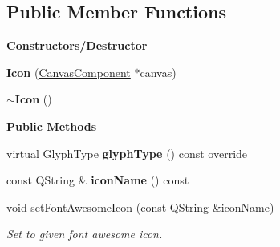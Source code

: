 \subsection*{Public Member Functions}
\begin{Indent}\textbf{ Constructors/\+Destructor}\par
\begin{DoxyCompactItemize}
\item 
\mbox{\label{classrev_1_1_icon_ad594b804eccb8eaa82b387af7d73b028}} 
{\bfseries Icon} (\mbox{\hyperlink{classrev_1_1_canvas_component}{Canvas\+Component}} $\ast$canvas)
\item 
\mbox{\label{classrev_1_1_icon_aa063a3fd745c54e780594195b546a21f}} 
{\bfseries $\sim$\+Icon} ()
\end{DoxyCompactItemize}
\end{Indent}
\begin{Indent}\textbf{ Public Methods}\par
\begin{DoxyCompactItemize}
\item 
\mbox{\label{classrev_1_1_icon_a6ffe16ff8c880b23695383a242117630}} 
virtual Glyph\+Type {\bfseries glyph\+Type} () const override
\item 
\mbox{\label{classrev_1_1_icon_af05cb7f6f6f53daaab546b4b8eb622e9}} 
const Q\+String \& {\bfseries icon\+Name} () const
\item 
\mbox{\label{classrev_1_1_icon_a3aca47792a70a37c1b77929a06e2db37}} 
void \mbox{\hyperlink{classrev_1_1_icon_a3aca47792a70a37c1b77929a06e2db37}{set\+Font\+Awesome\+Icon}} (const Q\+String \&icon\+Name)
\begin{DoxyCompactList}\small\item\em Set to given font awesome icon. \end{DoxyCompactList}\end{DoxyCompactItemize}
\end{Indent}
